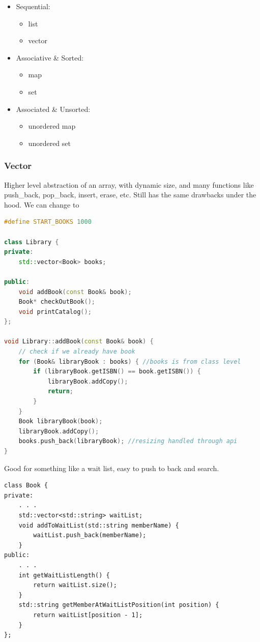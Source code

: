 \documentclass{report}
\begin{document}
\begin{itemize}
	\item Sequential:
	      \begin{itemize}
		      \item list
		      \item vector
	      \end{itemize}
	\item Associative \& Sorted:
	      \begin{itemize}
		      \item map
		      \item set
	      \end{itemize}
	\item Associated \& Unsorted:
	      \begin{itemize}
		      \item unordered map
		      \item unordered set
	      \end{itemize}
\end{itemize}


\subsubsection{Vector}

Higher level abstraction of an array, with dynamic size, and many functions like push\_back, pop\_back, insert, erase, etc. Still has the same drawbacks under the hood. We can change to

\begin{lstlisting}[language=C++]
#define START_BOOKS 1000

class Library {
private:
	std::vector<Book> books;
	
public:
	void addBook(const Book& book);
	Book* checkOutBook();
	void printCatalog();
};

void Library::addBook(const Book& book) {
	// check if we already have book
	for (Book& libraryBook : books) { //books is from class level
		if (libraryBook.getISBN() == book.getISBN()) {
			libraryBook.addCopy();
			return;
		}
	}
	Book libraryBook(book);
	libraryBook.addCopy();
	books.push_back(libraryBook); //resizing handled through api
}
\end{lstlisting}

Good for something like a wait list, easy to push to back and search.

\begin{lstlisting}
class Book {
private:
	. . .
	std::vector<std::string> waitList;
	void addToWaitList(std::string memberName) {
		waitList.push_back(memberName);
	}
public:
	. . .
	int getWaitListLength() {
		return waitList.size();
	}
	std::string getMemberAtWaitListPosition(int position) {
		return waitList[position - 1];
	}
};
\end{lstlisting}
\end{document}

